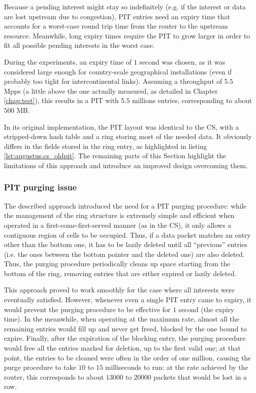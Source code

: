 \documentclass[11pt,a4paper,twoside,titlepage,openany]{book}
\begin{document}
Because a pending interest might stay so indefinitely (e.g. if the interest or data are lost upstream due to congestion), PIT entries need an expiry time that accounts for a worst-case round trip time from the router to the upstream resource. Meanwhile, long expiry times require the PIT to grow larger in order to fit all possible pending interests in the worst case.

During the experiments, an expiry time of $1$ second was chosen, as it was considered large enough for country-scale geographical installations (even if probably too tight for intercontinental links). Assuming a throughput of $5.5$ \gls{Mpps} (a little above the one actually measured, as detailed in Chapter \ref{chap:test}), this results in a PIT with $5.5$ millions entries, corresponding to about $500$ MB.

In its original implementation, the PIT layout was identical to the CS, with a stripped-down hash table and a ring storing most of the needed data. It obviously differs in the fields stored in the ring entry, as highlighted in listing \ref{lst:augustus.cs_oldpit}. The remaining parts of this Section highlight the limitations of this approach and introduce an improved design overcoming them.

\subsubsection{PIT purging issue}\label{sec:augustus.pit.purge}
The described approach introduced the need for a PIT purging procedure: while the management of the ring structure is extremely simple and efficient when operated in a first-come-first-served manner (as in the \gls{CS}), it only allows a contiguous region of cells to be occupied. Thus, if a data packet matches an entry other than the bottom one, it has to be lazily deleted until all ``previous'' entries (i.e. the ones between the bottom pointer and the deleted one) are also deleted.  
Thus, the purging procedure periodically cleans up space starting from the bottom of the ring, removing entries that are either expired or lazily deleted.

This approach proved to work smoothly for the case where all interests were eventually satisfied. However, whenever even a single PIT entry came to expiry, it would prevent the purging procedure to be effective for $1$ second (the expiry time). In the meanwhile, when operating at the maximum rate, almost all the remaining entries would fill up and never get freed, blocked by the one bound to expire. Finally, after the expiration of the blocking entry, the purging procedure would free all the entries marked for deletion, up to the first valid one; at that point, the entries to be cleaned were often in the order of one million, causing the purge procedure to take $10$ to $15$ milliseconds to run: at the rate achieved by the router, this corresponds to about $13000$ to $20000$ packets that would be lost in a row.
\end{document}
